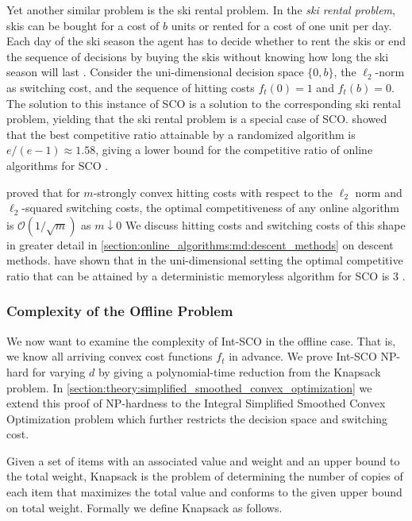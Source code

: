 Yet another similar problem is the ski rental problem. In the \textit{ski rental problem}, skis can be bought for a cost of $b$ units or rented for a cost of one unit per day. Each day of the ski season the agent has to decide whether to rent the skis or end the sequence of decisions by buying the skis without knowing how long the ski season will last \cite{Shah2021}. Consider the uni-dimensional decision space $\{0,b\}$, the $\ell_2$-norm as switching cost, and the sequence of hitting costs $f_t(0) = 1$ and $f_t(b) = 0$. The solution to this instance of SCO is a solution to the corresponding ski rental problem, yielding that the ski rental problem is a special case of SCO. \citeauthor*{Karlin1990} showed that the best competitive ratio attainable by a randomized algorithm is $e/(e-1) \approx 1.58$, giving a lower bound for the competitive ratio of online algorithms for SCO \cite{Karlin1990}.

\citeauthor*{Goel2019} proved that for $m$-strongly convex hitting costs with respect to the $\ell_2$ norm and $\ell_2$-squared switching costs, the optimal competitiveness of any online algorithm is $\mathcal{O}(1/\sqrt{m})$ as $m \downarrow 0$ \cite{Goel2019} We discuss hitting costs and switching costs of this shape in greater detail in \autoref{section:online_algorithms:md:descent_methods} on descent methods. \citeauthor*{Bansal2015} have shown that in the uni-dimensional setting the optimal competitive ratio that can be attained by a deterministic memoryless algorithm for SCO is 3 \cite{Bansal2015}.

\subsubsection{Complexity of the Offline Problem}

We now want to examine the complexity of Int-SCO in the offline case. That is, we know all arriving convex cost functions $f_t$ in advance. We prove Int-SCO NP-hard for varying $d$ by giving a polynomial-time reduction from the Knapsack problem. In \autoref{section:theory:simplified_smoothed_convex_optimization} we extend this proof of NP-hardness to the Integral Simplified Smoothed Convex Optimization problem which further restricts the decision space and switching cost.

Given a set of items with an associated value and weight and an upper bound to the total weight, Knapsack is the problem of determining the number of copies of each item that maximizes the total value and conforms to the given upper bound on total weight. Formally we define Knapsack as follows.

